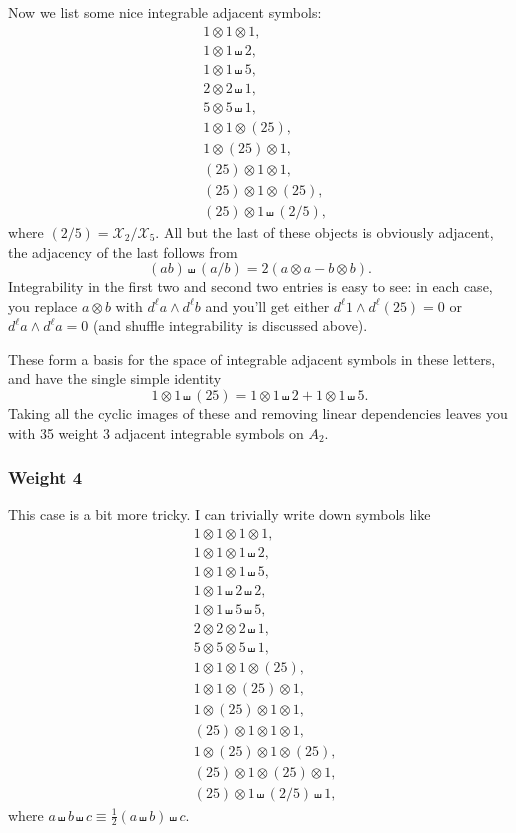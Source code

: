 \documentclass[12pt]{article}
\def\x{\mathcal{X}}
\def\dl{d^{\ell}}
\begin{document}
Now we list some nice integrable adjacent symbols:
\begin{eqnarray}
	&1\otimes1\otimes1, \\
	&1\otimes1\shuffle2, \\
	&1\otimes1\shuffle5, \\
	&2\otimes 2\shuffle1, \\
	&5\otimes 5\shuffle1, \\
	&1\otimes1\otimes(25), \\
	&1\otimes(25)\otimes1, \\
	&(25)\otimes1\otimes1,\\
	&(25)\otimes 1 \otimes (25),\\
	&(25)\otimes 1 \shuffle (2/5),
\end{eqnarray}
where $(2/5) = \x_2/\x_5$. All but the last of these objects is obviously adjacent, the adjacency of the last follows from 
\begin{equation}
	(ab)\shuffle(a/b) = 2(a\otimes a - b\otimes b). 	
\end{equation} 
Integrability in the first two and second two entries is easy to see: in each case, you replace $a\otimes b$ with $\dl a \wedge \dl b$ and you'll get either $\dl 1 \wedge \dl (25) = 0$ or $\dl a \wedge \dl a = 0$ (and shuffle integrability is discussed above). 

These form a basis for the space of integrable adjacent symbols in these letters, and have the single simple identity
\begin{equation}
	1\otimes1\shuffle(25) = 1\otimes1\shuffle2+1\otimes1\shuffle5.
\end{equation}
Taking all the cyclic images of these and removing linear dependencies leaves you with 35 weight 3 adjacent integrable symbols on $A_2$.
\subsubsection*{Weight 4}
This case is a bit more tricky. I can trivially write down symbols like 
\begin{eqnarray}
	&1\otimes1\otimes1\otimes1, \\
	&1\otimes1\otimes1\shuffle2, \\
	&1\otimes1\otimes1\shuffle5, \\
	&1\otimes1\shuffle2\shuffle2, \\
	&1\otimes1\shuffle5\shuffle5, \\
	&2\otimes2\otimes2\shuffle1, \\
	&5\otimes5\otimes5\shuffle1, \\
	&1\otimes1\otimes1\otimes(25),\\
	&1\otimes1\otimes(25)\otimes1,\\
	&1\otimes(25)\otimes1\otimes1,\\
	&(25)\otimes1\otimes1\otimes1,\\
	&1\otimes(25)\otimes1\otimes(25),\\
	&(25)\otimes1\otimes(25)\otimes1,\\
	&(25)\otimes1\shuffle(2/5)\shuffle1,
\end{eqnarray}
where $a\shuffle b\shuffle c \equiv \frac12(a\shuffle b)\shuffle c$.
\end{document}
